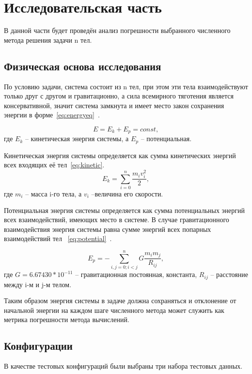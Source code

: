 \chapter{Исследовательская часть}

В данной части будет проведён анализ погрешности выбранного численного метода решения задачи n тел.

\section{Физическая основа исследования}

По условию задачи, система состоит из n тел, при этом эти тела взаимодействуют только друг с другом и гравитационно, а сила всемирного тяготения является консервативной, значит система замкнута и имеет место закон сохранения энергии в форме~\ref{eq:energyeq}~\cite{fn4}.

\begin{equation}
	\label{eq:energyeq}
	E = E_k + E_p = const,
\end{equation}
где $E_k$ -- кинетическая энергия системы, а $E_p$ -- потенциальная.

Кинетическая энергия системы определяется как сумма кинетических энергий всех входящих её тел~\ref{eq:kinetic}.
\begin{equation}
	\label{eq:kinetic}
	E_k = \sum_{i=0}^n{\frac{m_iv_i^2}{2}},
\end{equation}
где $m_i$ -- масса i-го тела, а $v_i$ --величина его скорости.

Потенциальная энергия системы определяется как сумма потенциальных энергий всех взаимодействий, имеющих место в системе. В случае гравитационного взаимодействия энергия системы равна сумме энергий всех попарных взаимодействий тел ~\ref{eq:potential}~\cite{fn4}.


\begin{equation}
	\label{eq:potential}
	E_p = -\sum_{i,j=0; i < j}^n{G\frac{m_im_j}{R_{ij}}},
\end{equation}
где $G = 6.67430 * 10^{-11}$ -- гравитационная постоянная, константа, $R_{ij}$ -- расстояние между i-м и j-м телом.

Таким образом энергия системы в задаче должна сохраняться и отклонение от начальной энергии на каждом шаге численного метода может служить как метрика погрешности метода вычислений.

\section{Конфигурации}
В качестве тестовых конфигураций были выбраны три набора тестовых данных.

